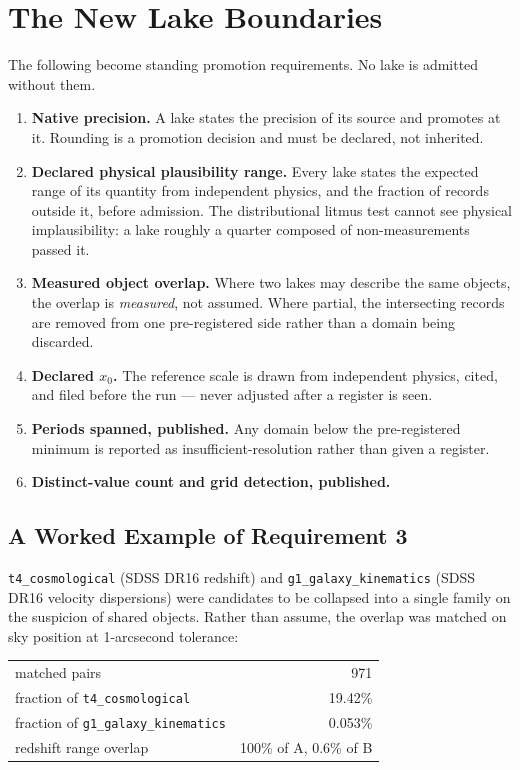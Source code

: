 \documentclass[11pt, letterpaper, openany]{book}
\begin{document}
\section{The New Lake Boundaries}

The following become standing promotion requirements. No lake is admitted without them.

\begin{enumerate}
    \item \textbf{Native precision.} A lake states the precision of its source and promotes at
          it. Rounding is a promotion decision and must be declared, not inherited.
    \item \textbf{Declared physical plausibility range.} Every lake states the expected range of
          its quantity from independent physics, and the fraction of records outside it, before
          admission. The distributional litmus test cannot see physical implausibility: a lake
          roughly a quarter composed of non-measurements passed it.
    \item \textbf{Measured object overlap.} Where two lakes may describe the same objects, the
          overlap is \emph{measured}, not assumed. Where partial, the intersecting records are
          removed from one pre-registered side rather than a domain being discarded.
    \item \textbf{Declared $x_0$.} The reference scale is drawn from independent physics, cited,
          and filed before the run --- never adjusted after a register is seen.
    \item \textbf{Periods spanned, published.} Any domain below the pre-registered minimum is
          reported as insufficient-resolution rather than given a register.
    \item \textbf{Distinct-value count and grid detection, published.}
\end{enumerate}

\subsection{A Worked Example of Requirement 3}

\texttt{t4\_cosmological} (SDSS DR16 redshift) and \texttt{g1\_galaxy\_kinematics} (SDSS DR16
velocity dispersions) were candidates to be collapsed into a single family on the suspicion of
shared objects. Rather than assume, the overlap was matched on sky position at 1-arcsecond
tolerance:

\begin{table}[H]
\centering
\small
\begin{tabular}{@{}lr@{}}
\toprule
matched pairs & 971 \\
fraction of \texttt{t4\_cosmological} & 19.42\% \\
fraction of \texttt{g1\_galaxy\_kinematics} & 0.053\% \\
redshift range overlap & 100\% of A, 0.6\% of B \\
\bottomrule
\end{tabular}
\end{table}
\end{document}
